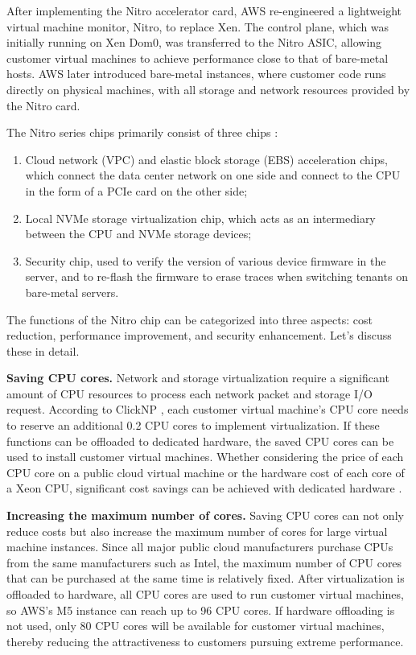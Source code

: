 After implementing the Nitro accelerator card, AWS re-engineered a lightweight virtual machine monitor, Nitro, to replace Xen. The control plane, which was initially running on Xen Dom0, was transferred to the Nitro ASIC, allowing customer virtual machines to achieve performance close to that of bare-metal hosts. AWS later introduced bare-metal instances, where customer code runs directly on physical machines, with all storage and network resources provided by the Nitro card.

The Nitro series chips primarily consist of three chips \cite{nitro-blog,nitro-talk,nitro-web}:
\begin{enumerate}
	\item Cloud network (VPC) and elastic block storage (EBS) acceleration chips, which connect the data center network on one side and connect to the CPU in the form of a PCIe card on the other side;
	\item Local NVMe storage virtualization chip, which acts as an intermediary between the CPU and NVMe storage devices;
	\item Security chip, used to verify the version of various device firmware in the server, and to re-flash the firmware to erase traces when switching tenants on bare-metal servers.
\end{enumerate}

The functions of the Nitro chip can be categorized into three aspects: cost reduction, performance improvement, and security enhancement. Let's discuss these in detail.

\textbf{Saving CPU cores.}
Network and storage virtualization require a significant amount of CPU resources to process each network packet and storage I/O request. According to ClickNP \cite{li2016clicknp}, each customer virtual machine's CPU core needs to reserve an additional 0.2 CPU cores to implement virtualization. If these functions can be offloaded to dedicated hardware, the saved CPU cores can be used to install customer virtual machines. Whether considering the price of each CPU core on a public cloud virtual machine or the hardware cost of each core of a Xeon CPU, significant cost savings can be achieved with dedicated hardware \cite{smartnic}.

\textbf{Increasing the maximum number of cores.}
Saving CPU cores can not only reduce costs but also increase the maximum number of cores for large virtual machine instances. Since all major public cloud manufacturers purchase CPUs from the same manufacturers such as Intel, the maximum number of CPU cores that can be purchased at the same time is relatively fixed. After virtualization is offloaded to hardware, all CPU cores are used to run customer virtual machines, so AWS's M5 instance can reach up to 96 CPU cores. If hardware offloading is not used, only 80 CPU cores will be available for customer virtual machines, thereby reducing the attractiveness to customers pursuing extreme performance.


